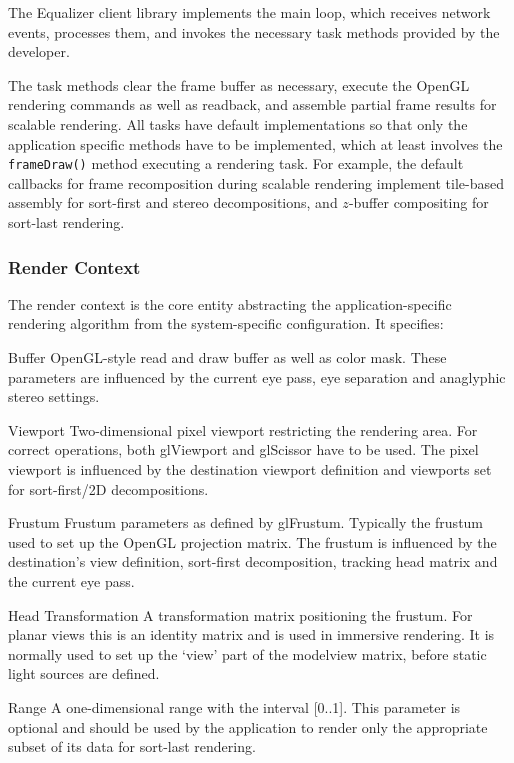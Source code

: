 The Equalizer client library implements the main loop, which receives network
events, processes them, and invokes the necessary task methods provided by the
developer.

The task methods clear the frame buffer as necessary, execute the OpenGL
rendering commands as well as readback, and assemble partial frame results for
scalable rendering. All tasks have default implementations so that only the
application specific methods have to be implemented, which at least involves the
 {\tt frameDraw()} method executing a rendering task. For example, the default
callbacks for frame recomposition during scalable rendering implement tile-based
assembly for sort-first and stereo decompositions, and $z$-buffer compositing
for sort-last rendering.

\subsubsection{Render Context}

The render context is the core entity abstracting the application-specific
rendering algorithm from the system-specific configuration. It specifies:

\begin{compactdesc}
 \item[Buffer] OpenGL-style read and draw buffer as well as color mask.
 These parameters are influenced by the current eye pass, eye
 separation and anaglyphic stereo settings.
 \item[Viewport] Two-dimensional pixel viewport restricting the
 rendering area. For correct operations, both
 \textsf{glViewport} and \textsf{glScissor} have to be used. The pixel
 viewport is influenced by the destination viewport
 definition and viewports set for sort-first/2D decompositions.
 \item[Frustum] Frustum parameters as defined by
 \textsf{glFrustum}. Typically the frustum used to set up the OpenGL projection
 matrix. The frustum is influenced by the destination's view
 definition, sort-first decomposition, tracking head matrix and the current eye pass.
 \item[Head Transformation] A transformation matrix positioning the frustum. For
 planar views this is an identity matrix and is used in immersive rendering.
 It is normally used to set up the `view' part of the modelview matrix, before
 static light sources are defined.
 \item[Range] A one-dimensional range with the interval [0..1]. This parameter is
 optional and should be used by the application to render only the appropriate
 subset of its data for sort-last rendering.
\end{compactdesc}

